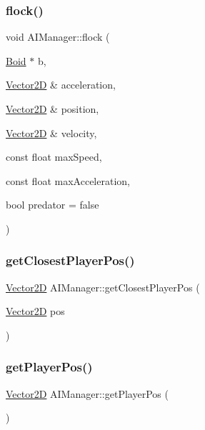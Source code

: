 \subsubsection{\texorpdfstring{flock()}{flock()}}
{\footnotesize\ttfamily void A\+I\+Manager\+::flock (\begin{DoxyParamCaption}\item[{\hyperlink{class_boid}{Boid} $\ast$}]{b,  }\item[{\hyperlink{class_vector2_d}{Vector2D} \&}]{acceleration,  }\item[{\hyperlink{class_vector2_d}{Vector2D} \&}]{position,  }\item[{\hyperlink{class_vector2_d}{Vector2D} \&}]{velocity,  }\item[{const float}]{max\+Speed,  }\item[{const float}]{max\+Acceleration,  }\item[{bool}]{predator = {\ttfamily false} }\end{DoxyParamCaption})\hspace{0.3cm}{\ttfamily [static]}}

\hypertarget{class_a_i_manager_a1b2223e6059e0b5d303dbb1845ec252a}{}\label{class_a_i_manager_a1b2223e6059e0b5d303dbb1845ec252a} 
\subsubsection{\texorpdfstring{get\+Closest\+Player\+Pos()}{getClosestPlayerPos()}}
{\footnotesize\ttfamily \hyperlink{class_vector2_d}{Vector2D} A\+I\+Manager\+::get\+Closest\+Player\+Pos (\begin{DoxyParamCaption}\item[{\hyperlink{class_vector2_d}{Vector2D}}]{pos }\end{DoxyParamCaption})\hspace{0.3cm}{\ttfamily [static]}}

\hypertarget{class_a_i_manager_ae15963d08e5b13b33c44d2f018b7d53c}{}\label{class_a_i_manager_ae15963d08e5b13b33c44d2f018b7d53c} 
\subsubsection{\texorpdfstring{get\+Player\+Pos()}{getPlayerPos()}}
{\footnotesize\ttfamily \hyperlink{class_vector2_d}{Vector2D} A\+I\+Manager\+::get\+Player\+Pos (\begin{DoxyParamCaption}{ }\end{DoxyParamCaption})\hspace{0.3cm}{\ttfamily [static]}}


